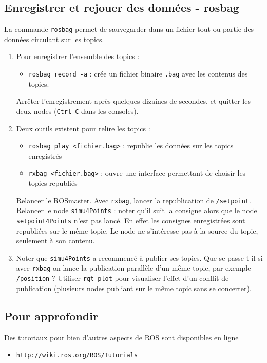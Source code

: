 \documentclass[12pt,a4paper]{article}
\begin{document}
\subsection{Enregistrer et rejouer des données - rosbag}
La commande \texttt{rosbag} permet de sauvegarder dans un fichier tout ou partie des données circulant sur les topics.
\begin{enumerate}

\item Pour enregistrer l'ensemble des topics : 
\begin{itemize}
\item \texttt{rosbag record -a} : crée un fichier binaire \texttt{.bag} avec les contenus des topics.
\end{itemize}
Arrêter l'enregistrement après quelques dizaines de secondes, et quitter les deux nodes (\texttt{Ctrl-C} dans les consoles).
\item Deux outils existent pour relire les topics :
\begin{itemize}
\item \texttt{rosbag play <fichier.bag>} : republie les données sur les topics enregistrés
\item \texttt{rxbag <fichier.bag>} : ouvre une interface permettant de choisir les topics republiés
\end{itemize}
Relancer le ROSmaster. Avec \texttt{rxbag}, lancer la republication de \texttt{/setpoint}.
Relancer le node \texttt{simu4Points} : noter qu'il suit la consigne alors que le node \texttt{setpoint4Points} n'est pas lancé. En effet les consignes enregistrées sont republiées sur le même topic. Le node ne s'intéresse pas à la source du topic, seulement à son contenu. 

\item Noter que  \texttt{simu4Points} a recommencé à publier ses topics. Que se passe-t-il si avec \texttt{rxbag} on lance la publication parallèle d'un même topic, par exemple \texttt{/position}  ? Utiliser \texttt{rqt\_plot} pour visualiser l'effet d'un conflit de publication (plusieurs nodes publiant sur le même topic sans se concerter).
\end{enumerate}

\subsection*{Pour approfondir}

Des tutoriaux pour bien d'autres aspects de ROS sont disponibles en ligne
\begin{itemize}
\item \texttt{http://wiki.ros.org/ROS/Tutorials}
\end{itemize}
\end{document}
